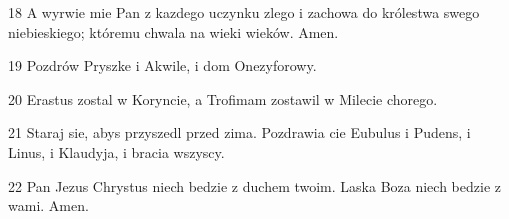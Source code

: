 \par 18 A wyrwie mie Pan z kazdego uczynku zlego i zachowa do królestwa swego niebieskiego; któremu chwala na wieki wieków. Amen.
\par 19 Pozdrów Pryszke i Akwile, i dom Onezyforowy.
\par 20 Erastus zostal w Koryncie, a Trofimam zostawil w Milecie chorego.
\par 21 Staraj sie, abys przyszedl przed zima. Pozdrawia cie Eubulus i Pudens, i Linus, i Klaudyja, i bracia wszyscy.
\par 22 Pan Jezus Chrystus niech bedzie z duchem twoim. Laska Boza niech bedzie z wami. Amen.


